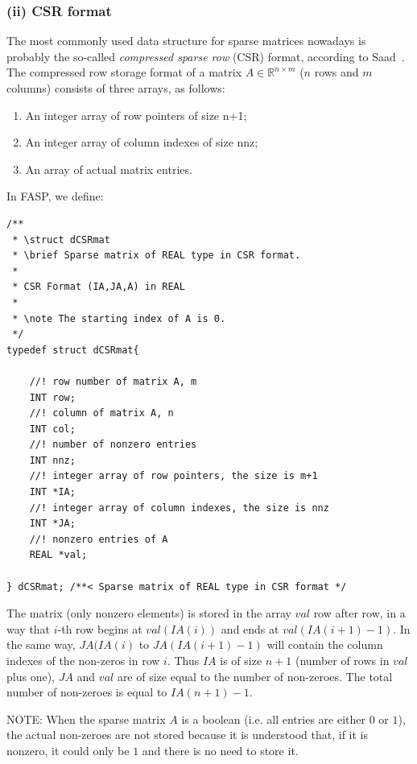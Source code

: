 \documentclass[11pt]{memoir}
\begin{document}
\subsubsection*{(ii) CSR format}
The most commonly used data structure for sparse matrices nowadays is probably the so-called {\em compressed sparse row}  (CSR) format, according to Saad~\cite{Saad.Saad.2003fv}. The compressed row storage format of a matrix $A\in \mathbb{R}^{n\times m}$ ($n$ rows and $m$ columns) consists of three arrays, as follows:
%
\begin{enumerate}
\item An integer array of row pointers of size n+1;
\item An integer array of column indexes of size nnz;
\item An array of actual matrix entries.
\end{enumerate}
%
In FASP, we define:
\begin{lstlisting}
/**
 * \struct dCSRmat
 * \brief Sparse matrix of REAL type in CSR format.
 *
 * CSR Format (IA,JA,A) in REAL
 *
 * \note The starting index of A is 0.
 */
typedef struct dCSRmat{
	
	//! row number of matrix A, m
	INT row;
	//! column of matrix A, n
	INT col;
	//! number of nonzero entries
	INT nnz;
	//! integer array of row pointers, the size is m+1
	INT *IA;
	//! integer array of column indexes, the size is nnz
	INT *JA;
	//! nonzero entries of A
	REAL *val;
	
} dCSRmat; /**< Sparse matrix of REAL type in CSR format */
\end{lstlisting}
%
The matrix ({only nonzero elements}) is stored in the array $val$
row after row, in a way that $i$-th row begins at $val(IA(i))$ and ends
at $val(IA(i+1)-1)$. In the same way, $JA(IA(i)$ to $JA(IA(i+1)-1)$ will
contain the column indexes of the non-zeros in row $i$. Thus $IA$ is of
size $n+1$ (number of rows in $val$ plus one), $JA$ and $val$ are of size
equal to the number of non-zeroes. The total number of non-zeroes is
equal to $IA(n+1)-1$.

\begin{snugshade}\noindent
NOTE: When the sparse matrix $A$ is a boolean (i.e. all entries are either $0$ or
$1$), the actual non-zeroes are not stored because it is understood that, if it is
nonzero, it could only be $1$ and there is no need to store it.
\end{snugshade}
\end{document}

